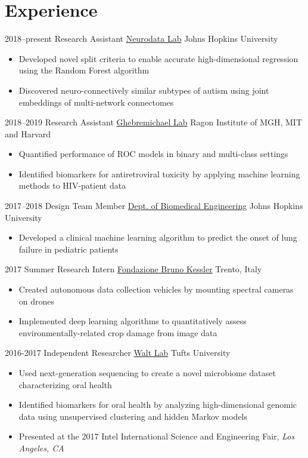 \section{Experience}

\cventry
{2018--present}
{Research Assistant}
{\href{https://neurodata.io}{Neurodata Lab}}
{Johns Hopkins University}
{}
{
\begin{itemize}
    \item Developed novel split criteria to enable accurate high-dimensional regression using the Random Forest algorithm
    \item Discovered neuro-connectively similar subtypes of autism using joint embeddings of multi-network connectomes
\end{itemize}
}

\cventry
{2018--2019}
{Research Assistant}
{\href{http://www.ragoninstitute.org/portfolio-item/ghebremichael/}{Ghebremichael Lab}}
{Ragon Institute of MGH, MIT and Harvard}
{}
{
\begin{itemize}
    \item Quantified performance of ROC models in binary and multi-class settings
    \item Identified biomarkers for antiretroviral toxicity by applying machine learning methods to HIV-patient data
\end{itemize}{}
}

\cventry
{2017--2018}
{Design Team Member}
{\href{https://cbid.bme.jhu.edu/academics/undergraduate-studies/}{Dept. of Biomedical Engineering}}
{Johns Hopkins University}
{}
{
\begin{itemize}
    \item Developed a clinical machine learning algorithm to predict the onset of lung failure in pediatric patients
\end{itemize}{}
}

\cventry
{2017}
{Summer Research Intern}
{\href{https://webvalley.fbk.eu}{Fondazione Bruno Kessler}}
{Trento, Italy}
{}
{
\begin{itemize}
    \item Created autonomous data collection vehicles by mounting spectral cameras on drones
    \item Implemented deep learning algorithms to quantitatively assess environmentally-related crop damage from image data
\end{itemize}{}
}

\cventry
{2016-2017}
{Independent Researcher}
{\href{https://waltlab.bwh.harvard.edu}{Walt Lab}}
{Tufts University}
{}
{
\begin{itemize}
    \item Used next-generation sequencing to create a novel microbiome dataset characterizing oral health
    \item Identified biomarkers for oral health by analyzing high-dimensional genomic data using unsupervised clustering and hidden Markov models
    \item Presented at the 2017 Intel International Science and Engineering Fair, \textit{Los Angeles, CA}
\end{itemize}{}
}
